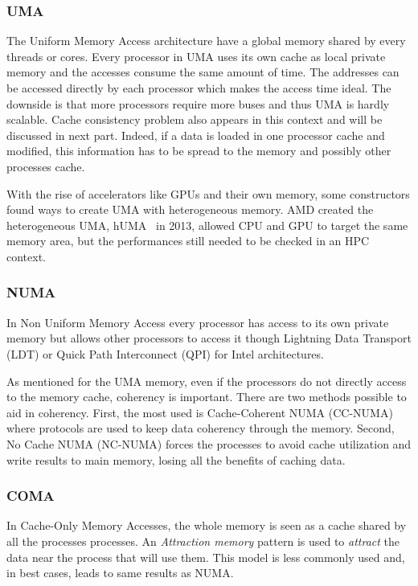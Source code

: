 \subsubsection{UMA}
The Uniform Memory Access architecture have a global memory shared by every threads or cores. 
Every processor in UMA uses its own cache as local private memory and the accesses consume the same amount of time.
The addresses can be accessed directly by each processor which makes the access time ideal. 
The downside is that more processors require more buses and thus UMA is hardly scalable. 
Cache consistency problem also appears in this context and will be discussed in next part.
Indeed, if a data is loaded in one processor cache and modified, this information has to be spread to the memory and possibly other processes cache. 

With the rise of accelerators like GPUs and their own memory, some constructors found ways to create UMA with heterogeneous memory.
AMD created the heterogeneous UMA, hUMA~\cite{rogers2013amd} in 2013, allowed CPU and GPU to target the same memory area, but the performances still needed to be checked in an HPC context.

\subsubsection{NUMA}
In Non Uniform Memory Access every processor has access to its own private memory but allows other processors to access it though Lightning Data Transport (LDT) or Quick Path Interconnect (QPI) for Intel architectures. 

As mentioned for the UMA memory, even if the processors do not directly access to the memory cache, coherency is important. 
There are two methods possible to aid in coherency.
First, the most used is Cache-Coherent NUMA (CC-NUMA) where protocols are used to keep data coherency through the memory. 
Second, No Cache NUMA (NC-NUMA) forces the processes to avoid cache utilization and write results to main memory, losing all the benefits of caching data. 

\subsubsection{COMA}
In Cache-Only Memory Accesses, the whole memory is seen as a cache shared by all the processes processes.
An \textit{Attraction memory} pattern is used to \textit{attract} the data near the process that will use them. 
This model is less commonly used and, in best cases, leads to same results as NUMA.

